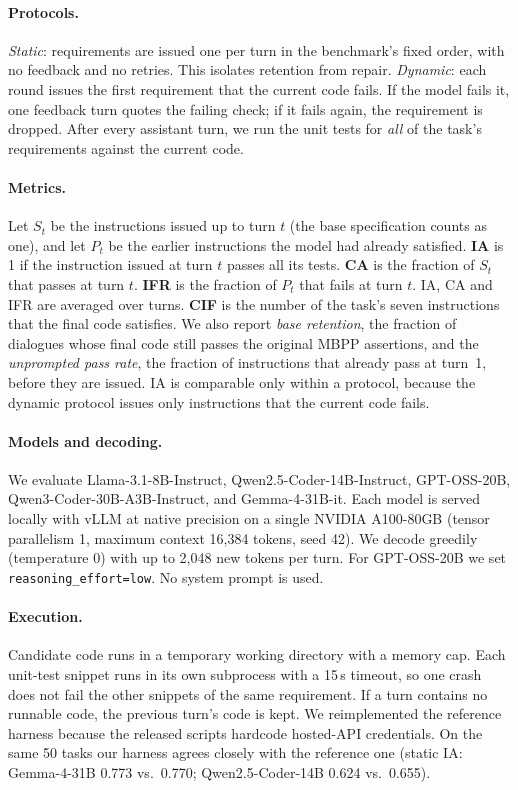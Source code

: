\paragraph{Protocols.}
\emph{Static}: requirements are issued one per turn in the benchmark's fixed
order, with no feedback and no retries. This isolates retention from repair.
\emph{Dynamic}: each round issues the first requirement that the current code
fails. If the model fails it, one feedback turn quotes the failing check; if
it fails again, the requirement is dropped. After every assistant turn, we run the unit
tests for \emph{all} of the task's requirements against the current code.

\paragraph{Metrics.}
Let $S_t$ be the instructions issued up to turn $t$ (the base specification
counts as one), and let $P_t$ be the earlier instructions the model had already
satisfied. \textbf{IA} is 1 if the instruction issued at turn $t$ passes all its
tests. \textbf{CA} is the fraction of $S_t$ that passes at turn $t$.
\textbf{IFR} is the fraction of $P_t$ that fails at turn $t$. IA, CA and IFR are
averaged over turns. \textbf{CIF} is the number of the task's seven
instructions that the final code satisfies. We also report \emph{base
retention}, the fraction of dialogues whose final code still passes the
original MBPP assertions, and the \emph{unprompted pass rate}, the fraction of
instructions that already pass at turn~1, before they are issued. IA is
comparable only within a protocol, because the dynamic protocol issues only
instructions that the current code fails.

\paragraph{Models and decoding.}
We evaluate Llama-3.1-8B-Instruct, Qwen2.5-Coder-14B-Instruct, GPT-OSS-20B,
Qwen3-Coder-30B-A3B-Instruct, and Gemma-4-31B-it. Each model is served locally
with vLLM at native precision on a single NVIDIA A100-80GB (tensor
parallelism 1, maximum context 16{,}384 tokens, seed 42). We decode greedily
(temperature 0) with up to 2{,}048 new tokens per turn. For GPT-OSS-20B we set
\texttt{reasoning\_effort=low}. No system prompt is used.

\paragraph{Execution.}
Candidate code runs in a temporary working directory with a memory cap. Each
unit-test snippet runs in its own subprocess with a 15\,s timeout, so one crash
does not fail the other snippets of the same requirement. If a turn contains no
runnable code, the previous turn's code is kept. We reimplemented the reference
harness because the released scripts hardcode hosted-API credentials. On the
same 50 tasks our harness agrees closely with the reference one (static IA:
Gemma-4-31B 0.773 vs.\ 0.770; Qwen2.5-Coder-14B 0.624 vs.\ 0.655).

